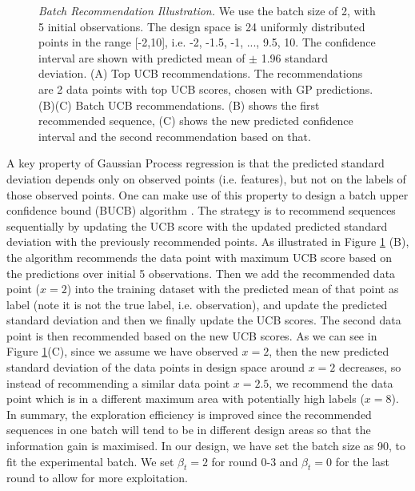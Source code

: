 \begin{figure}
\begin{subfigure}[b]{0.49\textwidth}
    \end{subfigure}
    \caption{\emph{Batch Recommendation Illustration.} We use the batch size of 2, with 5 initial observations. The design space is 24 uniformly distributed points in the range [-2,10], i.e. {-2, -1.5, -1, ..., 9.5, 10}.
    The confidence interval are shown with predicted mean of $\pm$ 1.96 standard deviation.
    (A) Top UCB recommendations. The recommendations are 2 data points with top UCB scores, chosen with GP predictions. 
    (B)(C) Batch UCB recommendations. (B) shows the first recommended sequence, (C) shows the new predicted confidence interval and the second recommendation based on that.}
    \label{fig:batch rec}
\end{figure}


A key property of Gaussian Process regression is that the predicted standard deviation depends only on observed points (i.e. features), but not on the labels of those observed points. 
One can make use of this property to design a batch upper confidence bound (BUCB) algorithm \cite{desautels2014parallelizing}.
The strategy is to recommend sequences sequentially by updating the UCB score with the updated predicted standard deviation with the previously recommended points.
As illustrated in Figure \ref{fig:batch rec} (B), the algorithm recommends the data point with maximum UCB score based on the predictions over initial 5 observations.  
Then we add the recommended data point ($x = 2$) into the training dataset with the predicted mean of that point as label (note it is not the true label, i.e. observation), and update the predicted standard deviation and then we finally update the UCB scores. 
The second data point is then recommended based on the new UCB scores.   
As we can see in Figure \ref{fig:batch rec}(C), since we assume we have observed $x = 2$, then the new predicted standard deviation of the data points in design space around $x =2$  decreases, so instead of recommending a similar data point $x = 2.5$, we recommend the data point which is in a different maximum area with potentially high labels ($x = 8$).     
In summary, the exploration efficiency is improved since the recommended sequences in one batch will tend to be in different design areas so that the information gain is maximised. 
In our design, we have set the batch size as 90, to fit the experimental batch.
We set $\beta_t = 2$ for round 0-3 and $\beta_t = 0$ for the last round to allow for more exploitation.